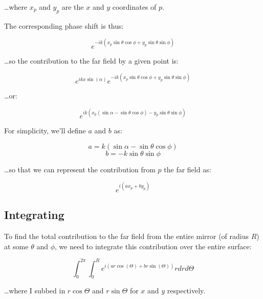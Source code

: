 \documentclass[etd,oneside,senior]{BYUPhys}
\begin{document}
\ldots where $x_p$ and $y_p$ are the $x$ and $y$ coordinates of $p$.

The corresponding phase shift is thus:

\begin{equation}
  e^{-ik(x_p\sin{\theta}\cos{\phi}+y_p\sin{\theta}\sin{\phi})}
\end{equation}

\ldots so the contribution to the far field by a given point is:

\begin{equation}
  e^{ikx\sin\left({\alpha}\right)}e^{-ik(x_p\sin{\theta}\cos{\phi}+y_p\sin{\theta}\sin{\phi})}
\end{equation}

\ldots or:

\begin{equation}
  e^{ik\left(x_p(\sin{\alpha}-\sin{\theta}\cos{\phi})-y_p\sin{\theta}\sin{\phi}\right)}
\end{equation}

For simplicity, we'll define $a$ and $b$ as:

\begin{equation}
  a = k\left(\sin{\alpha}-\sin{\theta}\cos{\phi}\right)
\end{equation}
\begin{equation}
  b = -k\sin{\theta}\sin{\phi}
\end{equation}

\ldots so that we can represent the contribution from $p$ the far field as:

\begin{equation}
  e^{i(ax_p+by_p)}
\end{equation}

\subsection{Integrating} \label{sec:integrating}

To find the total contribution to the far field from the entire mirror (of radius $R$) at some $\theta$ and $\phi$, we need to integrate this contribution over the entire surface:

\begin{equation}\label{eq:integral1}
  \int_0^{2\pi}\int_0^R e^{i(ar\cos(\Theta)+br\sin(\Theta))} rdrd\Theta
\end{equation}

\ldots where I subbed in $r\cos\Theta$ and $r\sin\Theta$ for $x$ and $y$ respectively.
\end{document}
